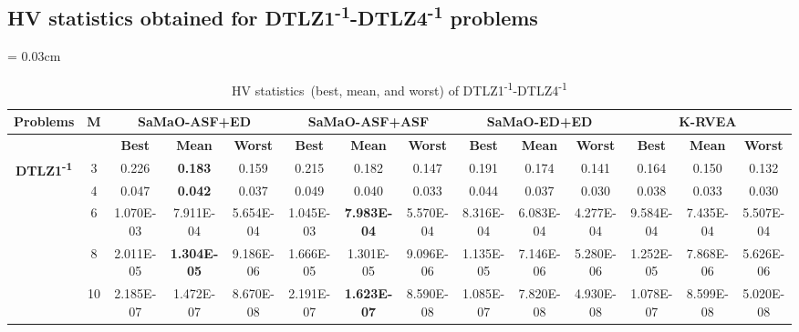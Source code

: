 \documentclass[onecolumn,10pt]{asme2ej}
\begin{document}
\clearpage

\subsection{HV statistics obtained for DTLZ1\textsuperscript{-1}-DTLZ4\textsuperscript{-1} problems}

\begin{table}[!htb]\scriptsize
	\centering
	\caption{HV statistics~(best, mean, and worst) of DTLZ1\textsuperscript{-1}-DTLZ4\textsuperscript{-1}}
	\label{tab:KHTTab:3}
	\tabcolsep = 0.03cm
	\begin{tabular}{|c|c|c|c|c|c|c|c|c|c|c|c|c|c|}
	\hline
	\textbf{Problems}                                     & \textbf{M} & \multicolumn{3}{c|}{\textbf{SaMaO-ASF+ED}}          & \multicolumn{3}{c|}{\textbf{SaMaO-ASF+ASF}}         & \multicolumn{3}{c|}{\textbf{SaMaO-ED+ED}}           & \multicolumn{3}{c|}{\textbf{K-RVEA}}                \\ \hline
	\textbf{}                                             & \textbf{}  & \textbf{Best} & \textbf{Mean}      & \textbf{Worst} & \textbf{Best} & \textbf{Mean}      & \textbf{Worst} & \textbf{Best} & \textbf{Mean}      & \textbf{Worst} & \textbf{Best} & \textbf{Mean}      & \textbf{Worst} \\ \hline
	\multirow{5}{*}{\textbf{DTLZ1\textsuperscript{-1}}} & 3          & 0.226         & \textbf{0.183}     & 0.159          & 0.215         & 0.182              & 0.147          & 0.191         & 0.174              & 0.141          & 0.164         & 0.150              & 0.132          \\ \cline{2-14} 
	& 4          & 0.047         & \textbf{0.042}     & 0.037          & 0.049         & 0.040              & 0.033          & 0.044         & 0.037              & 0.030          & 0.038         & 0.033              & 0.030          \\ \cline{2-14} 
	& 6          & 1.070E-03     & 7.911E-04          & 5.654E-04      & 1.045E-03     & \textbf{7.983E-04} & 5.570E-04      & 8.316E-04     & 6.083E-04          & 4.277E-04      & 9.584E-04     & 7.435E-04          & 5.507E-04      \\ \cline{2-14} 
	& 8          & 2.011E-05     & \textbf{1.304E-05} & 9.186E-06      & 1.666E-05     & 1.301E-05          & 9.096E-06      & 1.135E-05     & 7.146E-06          & 5.280E-06      & 1.252E-05     & 7.868E-06          & 5.626E-06      \\ \cline{2-14} 
	& 10         & 2.185E-07     & 1.472E-07          & 8.670E-08      & 2.191E-07     & \textbf{1.623E-07} & 8.590E-08      & 1.085E-07     & 7.820E-08          & 4.930E-08      & 1.078E-07     & 8.599E-08          & 5.020E-08      \\ \hline

\end{tabular}
\end{table}
\end{document}
